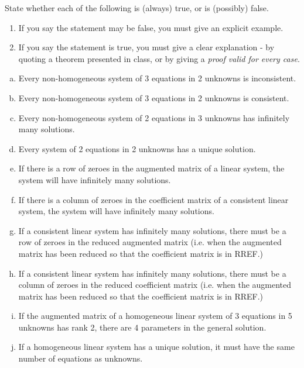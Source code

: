 \begin{prob}
\end{prob} \begin{prob} \label{prob13.4}   State whether each of the following is (always) true,
or is (possibly) false.    
   \smallskip    
\begin{enumerate}[$\bullet$]
\item If you say the statement may be false, you   must give an explicit example.  
\item If you say the statement is true, you must give a clear explanation -   by quoting a theorem presented in class, or by giving a {\it proof valid for every  case}. 
\end{enumerate}
\medskip
\begin{enumerate}[a)]
\item Every non-homogeneous system of 3 equations in 2 unknowns is inconsistent.
\medskip
%
\item\sov Every non-homogeneous system of 3 equations in 2 unknowns is consistent.

\medskip
%
\item Every non-homogeneous system of 2 equations in 3 unknowns has infinitely many solutions.
\medskip
%
\item\sov Every  system of 2 equations in 2 unknowns has a unique solution.
\medskip
%
\item If there is a row of zeroes in the augmented matrix of a linear system, the system will have infinitely many solutions.
\medskip
%
\item\sov If there is a column of zeroes in the coefficient matrix of a consistent linear system, the system will have infinitely many solutions.
\medskip
%
\item If a consistent linear system has infinitely many solutions, there must be a row of zeroes in the reduced augmented matrix (i.e. when the augmented matrix  has been reduced so that the coefficient matrix is in RREF.)
\medskip
%
\item\sov If a consistent linear system has infinitely many solutions, there must be a column of zeroes in the reduced coefficient matrix (i.e. when the augmented matrix has been reduced so that the coefficient matrix is in RREF.)
\medskip
%
\item If the augmented matrix of a homogeneous linear system of 3 equations in 5 unknowns has rank 2, there are 4 parameters in the general solution.
\medskip
%
\item\sov If a homogeneous linear system has a unique solution, it must have the same number of equations as unknowns.
\medskip
%
\end{enumerate}

\end{prob}


